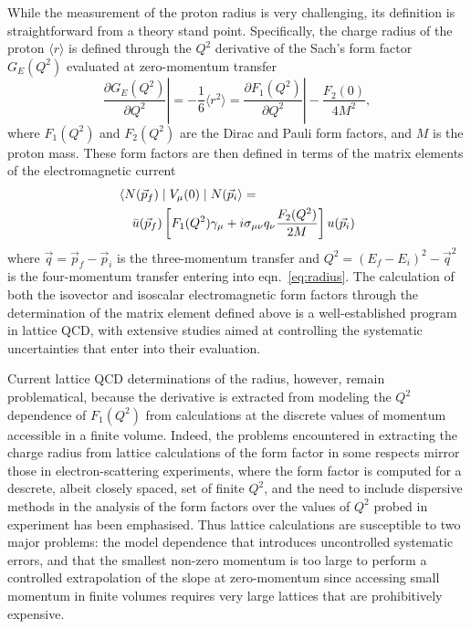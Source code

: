 \documentclass[prd,aps,twocolumn,superscriptaddress,tightenlines,nofootinbib,floatfix,preprintnumbers,10pt]{revtex4-1}
\begin{document}
While the measurement of the proton radius is very challenging, its
definition is straightforward from a theory stand point. Specifically,
the charge radius of the proton $\langle r \rangle$ is defined through the $Q^2$
derivative of the Sach's form factor $G_E(Q^2)$
evaluated at zero-momentum transfer
\begin{equation}
  \left. \frac{\partial G_E(Q^2)}{\partial Q^2} \right| = -\frac{1}{6}
    \langle r^2 \rangle = \left. \frac{\partial F_1(Q^2)}{\partial
      Q^2}\right| - \frac{F_2(0)}{4 M^2},\label{eq:radius}
\end{equation}
where $F_1(Q^2)$ and $F_2(Q^2)$ are the Dirac and Pauli form factors,
and $M$ is the proton mass.
These form factors are then defined in terms of the matrix elements of
the electromagnetic current
\begin{eqnarray}
\lefteqn{\langle N(\vec{p}_f) \mid V_{\mu}(0) \mid N(\vec{p}_i \rangle
  =} \nonumber \\
& &  \bar{u}(\vec{p}_f) \left[ F_1(Q^2) \gamma_\mu + i\sigma_{\mu\nu}
    q_\nu \frac{F_2(Q^2)}{2 M} \right] u(\vec{p}_i)
\end{eqnarray}
where $\vec{q} = \vec{p}_f - \vec{p}_i$ is the three-momentum transfer
and $Q^2 = (E_f - E_i)^2 - \vec{q}^2$ is the four-momentum transfer
entering into eqn.~\ref{eq:radius}.  The calculation of both the
isovector and isoscalar electromagnetic form factors through the
determination of the matrix element defined above is a
well-established program in lattice QCD, with extensive studies aimed
at controlling the systematic uncertainties that enter into their
evaluation.

Current lattice QCD determinations of the radius, however, remain
problematical, because the derivative is extracted from modeling the
$Q^2$ dependence of $F_1(Q^2)$ from calculations at the discrete
values of momentum accessible in a finite volume.  Indeed, the
problems encountered in extracting the charge radius from lattice
calculations of the form factor in some respects mirror those in
electron-scattering experiments, where the form factor is computed for
a descrete, albeit closely spaced, set of finite $Q^2$, and the need
to include dispersive methods in the analysis of the form factors over
the values of $Q^2$ probed in experiment has been
emphasised\cite{Alarcon:2018irp}.  Thus lattice calculations are
susceptible to two major problems: the model dependence that
introduces uncontrolled systematic errors, and that the smallest
non-zero momentum is too large to perform a controlled extrapolation
of the slope at zero-momentum since accessing small momentum in finite
volumes requires very large lattices that are prohibitively expensive.
\end{document}
